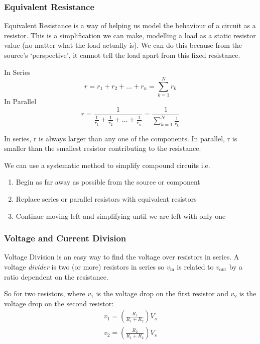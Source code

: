 \documentclass[12pt]{article}
\begin{document}
\subsubsection{Equivalent Resistance}
Equivalent Resistance is a way of helping us model the behaviour of a circuit as a resistor.
This is a simplification we can make, modelling a load as a static resistor value (no matter what the load actually is).
We can do this because from the source's `perspective', it cannot tell the load apart from this fixed resistance.

In Series
\begin{equation*}
  r = r_1 + r_2 + \dots + r_n = \sum^N_{k=1} r_k
\end{equation*}
In Parallel
\begin{equation*}
  r = \frac{1}{\frac{1}{r_1} + \frac{1}{r_2} + \dots + \frac{1}{r_n}} = \frac{1}{\sum^N_{k=1}\frac{1}{r_k}}
\end{equation*}


In series, r is always larger than any one of the components.
In parallel, r is smaller than the smallest resistor contributing to the resistance. 

We can use a systematic method to simplify compound circuits i.e.
\begin{enumerate}
  \item Begin as far away as possible from the source or component
  \item Replace series or parallel resistors with equivalent resistors
  \item Continue moving left and simplifying until we are left with only one
\end{enumerate}

\subsubsection{Voltage and Current Division}
Voltage Division is an easy way to find the voltage over resistors in series.
A voltage \textit{divider} is two (or more) resistors in series so $v_{\text{in}}$ is related to $v_{\text{out}}$ by a ratio dependent on the resistance.

So for two resistors, where $v_1$ is the voltage drop on the first resistor and $v_2$ is the voltage drop on the second resistor:
\begin{align*}
  v_1 = (\frac{R_1}{R_1 + R_2})V_s \\
  v_2 = (\frac{R_2}{R_1 + R_2})V_s \\
\end{align*} 
\end{document}
